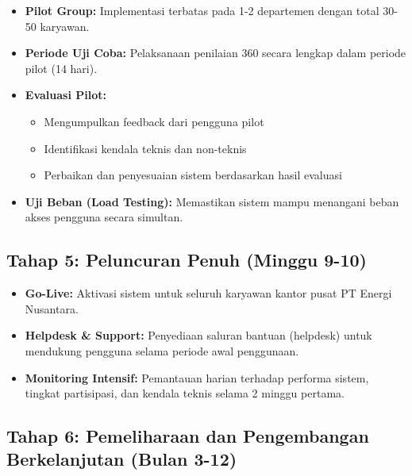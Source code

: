 \documentclass[12pt,a4paper,oneside]{report}
\begin{document}
\begin{itemize}
  \item \textbf{Pilot Group:} Implementasi terbatas pada 1-2 departemen dengan total 30-50 karyawan.
  \item \textbf{Periode Uji Coba:} Pelaksanaan penilaian 360\textdegree{} secara lengkap dalam periode pilot (14 hari).
  \item \textbf{Evaluasi Pilot:} 
    \begin{itemize}
      \item Mengumpulkan feedback dari pengguna pilot
      \item Identifikasi kendala teknis dan non-teknis
      \item Perbaikan dan penyesuaian sistem berdasarkan hasil evaluasi
    \end{itemize}
  \item \textbf{Uji Beban (Load Testing):} Memastikan sistem mampu menangani beban akses pengguna secara simultan.
\end{itemize}

\subsection{Tahap 5: Peluncuran Penuh (Minggu 9-10)}

\begin{itemize}
  \item \textbf{Go-Live:} Aktivasi sistem untuk seluruh karyawan kantor pusat PT Energi Nusantara.
  \item \textbf{Helpdesk \& Support:} Penyediaan saluran bantuan (helpdesk) untuk mendukung pengguna selama periode awal penggunaan.
  \item \textbf{Monitoring Intensif:} Pemantauan harian terhadap performa sistem, tingkat partisipasi, dan kendala teknis selama 2 minggu pertama.
\end{itemize}

\subsection{Tahap 6: Pemeliharaan dan Pengembangan Berkelanjutan (Bulan 3-12)}
\end{document}
